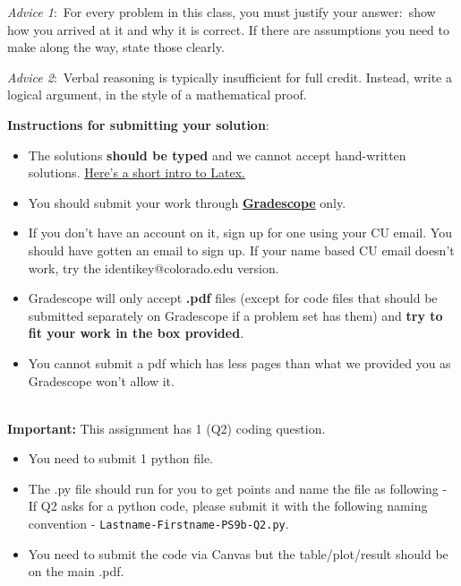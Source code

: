\documentclass[12pt]{article}
\theoremstyle{remark}
\begin{document}
\renewcommand{\headrulewidth}{0.5pt}

\phantom{Test}

\begin{small}
\textit{Advice 1}:\ For every problem in this class, you must justify your answer:\ show how you arrived at it and why it is correct. If there are assumptions you need to make along the way, state those clearly.
\vspace{-3mm} 

\textit{Advice 2}:\ Verbal reasoning is typically insufficient for full credit. Instead, write a logical argument, in the style of a mathematical proof.\\
\vspace{-3mm} 

\textbf{Instructions for submitting your solution}:
\vspace{-5mm} 

\begin{itemize}
	\item The solutions \textbf{should be typed} and we cannot accept hand-written solutions. \href{http://ece.uprm.edu/~caceros/latex/introduction.pdf}{Here's a short intro to Latex.}
	\item You should submit your work through \href{https://www.gradescope.com/courses/59294}{\textbf{Gradescope}} only.
	\item If you don't have an account on it, sign up for one using your CU email. You should have gotten an email to sign up. If your name based CU email doesn't work, try the identikey@colorado.edu version. 
	\item Gradescope will only accept \textbf{.pdf} files (except for code files that should be submitted separately on Gradescope if a problem set has them) and \textbf{try to fit your work in the box provided}. 
	\item You cannot submit a pdf which has less pages than what we provided you as Gradescope won't allow it. 
\end{itemize}
\vspace{-4mm} 
\end{small}

\hrulefill
\pagebreak
\\
\textbf{Important:} This assignment has 1 (Q2) coding question. 
\begin{itemize}
    \item You need to submit 1 python file.
    \item The .py file should run for you to get points and name the file as following - \\
If Q2 asks for a python code, please submit it with the following naming convention - \texttt{Lastname-Firstname-PS9b-Q2.py}.
\item You need to submit the code via Canvas but the table/plot/result should be on the main .pdf.
\end{itemize}
\pagebreak
\end{document}
